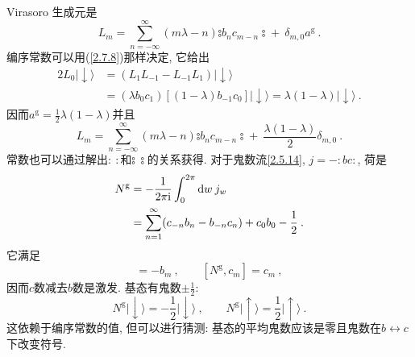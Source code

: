 Virasoro 生成元是
\begin{equation}
L_{m}=\sum_{n=-\infty}^{\infty}(m \lambda-n) \mathrel{\typecolon b_{n} c_{m-n}\typecolon}+ \:\delta_{m, 0} a^{\mathrm{g}} \:. \label{2.7.19}
\end{equation}
编序常数可以用(\ref{2.7.8})那样决定, 它给出
\begin{align}
2 L_{0}\lvert \downarrow\rangle &= (L_{1} L_{-1}-L_{-1} L_{1}) \lvert \downarrow\rangle \nonumber \\
&= (\lambda b_{0} c_{1})[(1-\lambda) b_{-1} c_{0}]\lvert \downarrow\rangle=\lambda(1-\lambda)\lvert \downarrow\rangle \:. \label{2.7.20}
\end{align}
因而$a^{\mathrm{g}}=\frac{1}{2} \lambda(1-\lambda)$并且
\begin{equation}
L_{m}=\sum_{n=-\infty}^{\infty}(m \lambda-n) \mathrel{\typecolon b_{n} c_{m-n}\typecolon} + \: \frac{\lambda(1-\lambda)}{2} \delta_{m, 0} \:.
\label{2.7.21}
\end{equation}
常数也可以通过解出$\mathrel{:\::}$和$\mathrel{\typecolon\:\typecolon}$的关系获得. 对于鬼数流\eqref{2.5.14}, $j={-}:\mathrel{bc}:$, 荷是
\begin{align}
N^{\mathrm{g}} &=-\frac{1}{2 \pi \mathrm{i}} \int_{0}^{2 \pi} \mathrm{d} w \: j_{w} \nonumber \\
&=\sum_{n=1}^{\infty}(c_{-n} b_{n}-b_{-n} c_{n})+c_{0} b_{0}-\frac{1}{2} \:. \label{2.7.22}
\end{align}
它满足
\begin{equation}
[N^{\mathrm{g}}, b_{m}]=-b_{m}\:, \qquad  [N^{\mathrm{g}}, c_{m}]=c_{m} \:, \label{2.7.23}
\end{equation}
因而$c$数减去$b$数是激发. 基态有鬼数$\pm \frac{1}{2}$:
\begin{equation}
N^{\mathrm{g}}\lvert \downarrow\rangle = -\frac{1}{2}\lvert \downarrow\rangle \:, \qquad 
N^{\mathrm{g}}\lvert \uparrow\rangle = \frac{1}{2}\lvert \uparrow\rangle \:. \label{2.7.24}
\end{equation}
这依赖于编序常数的值, 但可以进行猜测: 基态的平均鬼数应该是零且鬼数在$b \leftrightarrow c$ 下改变符号.

